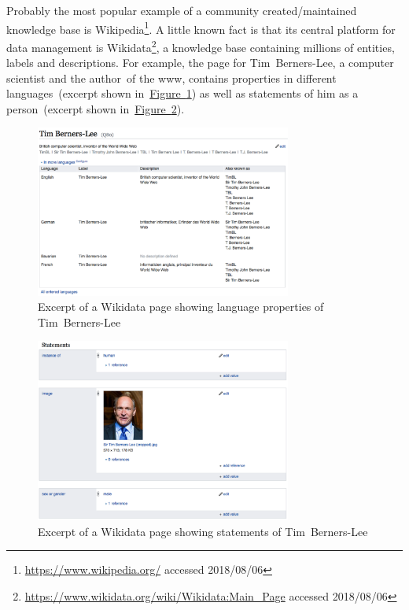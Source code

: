 Probably the most popular example of a community created/maintained knowledge base is Wikipedia\footnote{\url{https://www.wikipedia.org/} accessed 2018/08/06}. A little known fact is that its central platform for data management is Wikidata\footnote{\url{https://www.wikidata.org/wiki/Wikidata:Main_Page} accessed 2018/08/06}, a knowledge base containing millions of entities, labels and descriptions. For example, the page for Tim~Berners-Lee, a computer scientist and the \guillemotright author\guillemotleft~of the \gls{www}, contains properties in different languages~(excerpt shown in~\hyperref[fig:wikidata_tim_berners_lee_lang]{Figure~\ref*{fig:wikidata_tim_berners_lee_lang}}) as well as statements of him as a person~(excerpt shown in~\hyperref[fig:wikidata_tim_berners_lee_stat]{Figure~\ref*{fig:wikidata_tim_berners_lee_stat}}). 
\begin{figure}
	 \centering
	 \includegraphics[width=0.75\textwidth]{graphics/wikidata_tim_berners_lee_lang}
	 \caption{Excerpt of a Wikidata page showing language properties of Tim~Berners-Lee}\label{fig:wikidata_tim_berners_lee_lang}
\end{figure}
\begin{figure}
	 \centering
	 \includegraphics[width=0.75\textwidth]{graphics/wikidata_tim_berners_lee_stat}
	 \caption{Excerpt of a Wikidata page showing statements of Tim~Berners-Lee}\label{fig:wikidata_tim_berners_lee_stat}
\end{figure}
